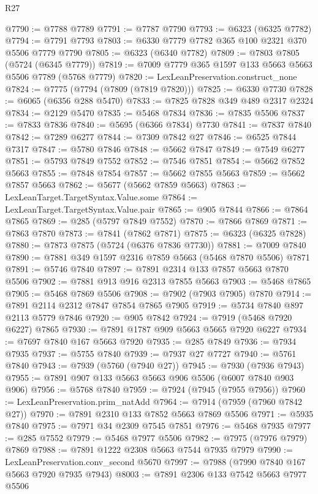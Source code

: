 \begin{lexlean}{R27}
\begin{coremodule}
@7790 := @7788 @7789
@7791 := @7787 @7790
@7793 := @6323 (@6325 @7782)
@7794 := @7791 @7793
@7803 := @6330 @7779 @7782 @365 @100 @2321 @370 @5506 @7779 @7790
@7805 := @6323 (@6340 @7782)
@7809 := @7803 @7805 (@5724 (@6345 @7779))
@7819 := @7009 @7779 @365 @1597 @133 @5663 @5663 @5506 @7789 (@5768 @7779)
@7820 := LexLeanPreservation.construct_none
@7824 := @7775 (@7794 (@7809 (@7819 @7820)))
@7825 := @6330 @7730
@7828 := @6065 (@6356 @288 @5470)
@7833 := @7825 @7828 @349 @489 @2317 @2324
@7834 := @2129 @5470
@7835 := @5468 @7834
@7836 := @7835 @5506
@7837 := @7833 @7836
@7840 := @5695 (@6366 @7834) @7730
@7841 := @7837 @7840
@7842 := @7289 @6277
@7844 := @7309 @7842 @27
@7846 := @6525 @7844 @7317
@7847 := @5780 @7846
@7848 := @5662 @7847
@7849 := @7549 @6277
@7851 := @5793 @7849 @7552
@7852 := @7546 @7851
@7854 := @5662 @7852 @5663
@7855 := @7848 @7854
@7857 := @5662 @7855 @5663
@7859 := @5662 @7857 @5663
@7862 := @5677 (@5662 @7859 @5663)
@7863 := LexLeanTarget.TargetSyntax.Value.some
@7864 := LexLeanTarget.TargetSyntax.Value.pair
@7865 := @905 @7844
@7866 := @7864 @7865
@7869 := @285 (@5797 @7849 @7552)
@7870 := @7866 @7869
@7871 := @7863 @7870
@7873 := @7841 (@7862 @7871)
@7875 := @6323 (@6325 @7828)
@7880 := @7873 @7875 (@5724 (@6376 @7836 @7730))
@7881 := @7009 @7840
@7890 := @7881 @349 @1597 @2316 @7859 @5663 (@5468 @7870 @5506) @7871
@7891 := @5746 @7840
@7897 := @7891 @2314 @133 @7857 @5663 @7870 @5506
@7902 := @7881 @913 @916 @2313 @7855 @5663
@7903 := @5468 @7865
@7905 := @5468 @7869 @5506
@7908 := @7902 (@7903 @7905) @7870
@7914 := @7891 @2114 @2312 @7847 @7854 @7865 @7905
@7919 := @5734 @7840 @897 @2113 @5779 @7846
@7920 := @905 @7842
@7924 := @7919 (@5468 @7920 @6227) @7865
@7930 := @7891 @1787 @909 @5663 @5665 @7920 @6227
@7934 := @7697 @7840 @167 @5663 @7920
@7935 := @285 @7849
@7936 := @7934 @7935
@7937 := @5755 @7840
@7939 := @7937 @27 @7727
@7940 := @5761 @7840
@7943 := @7939 (@5760 (@7940 @27))
@7945 := @7930 (@7936 @7943)
@7955 := @7891 @907 @133 @5663 @5663 @906 @5506 (@6007 @7840 @903 @906)
@7956 := @5768 @7840
@7959 := @7924 (@7945 (@7955 @7956))
@7960 := LexLeanPreservation.prim_natAdd
@7964 := @7914 (@7959 (@7960 @7842 @27))
@7970 := @7891 @2310 @133 @7852 @5663 @7869 @5506
@7971 := @5935 @7840
@7975 := @7971 @34 @2309 @7545 @7851
@7976 := @5468 @7935
@7977 := @285 @7552
@7979 := @5468 @7977 @5506
@7982 := @7975 (@7976 @7979) @7869
@7988 := @7891 @1222 @2308 @5663 @7544 @7935 @7979
@7990 := LexLeanPreservation.conv_second @5670
@7997 := @7988 (@7990 @7840 @167 @5663 @7920 @7935 @7943)
@8003 := @7891 @2306 @133 @7542 @5663 @7977 @5506

\end{coremodule}
\end{lexlean}
